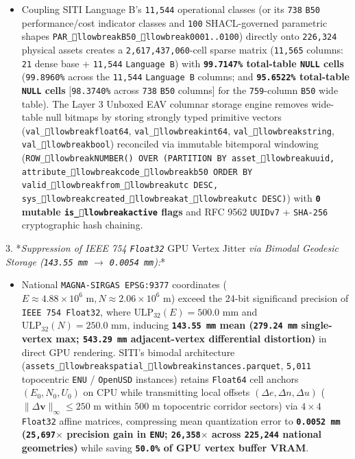 \documentclass[10pt,a4paper]{article}
\begin{document}
\begin{itemize}
  \item Coupling SITI Language B's \texttt{11,544} operational classes (or its \texttt{738} \texttt{B50} performance/cost indicator classes and \texttt{100} SHACL-governed parametric shapes \texttt{PAR\_llowbreak{}B50\_llowbreak{}0001..0100}) directly onto \texttt{226,324} physical assets creates a \texttt{2,617,437,060}-cell sparse matrix (\texttt{11,565} columns: \texttt{21} dense base + \texttt{11,544} \texttt{Language B}) with \textbf{\texttt{99.7147\%} total-table \texttt{NULL} cells} (\texttt{99.8960\%} across the \texttt{11,544} \texttt{Language B} columns; and \textbf{\texttt{95.6522\%} total-table \texttt{NULL} cells} [\texttt{98.3740\%} across \texttt{738} \texttt{B50} columns] for the \texttt{759}-column \texttt{B50} wide table). The Layer 3 Unboxed EAV columnar storage engine removes wide-table null bitmaps by storing strongly typed primitive vectors (\texttt{val\_llowbreak{}float64}, \texttt{val\_llowbreak{}int64}, \texttt{val\_llowbreak{}string}, \texttt{val\_llowbreak{}bool}) reconciled via immutable bitemporal windowing (\texttt{ROW\_llowbreak{}NUMBER() OVER (PARTITION BY asset\_llowbreak{}uuid, attribute\_llowbreak{}code\_llowbreak{}b50 ORDER BY valid\_llowbreak{}from\_llowbreak{}utc DESC, sys\_llowbreak{}created\_llowbreak{}at\_llowbreak{}utc DESC)}) with \textbf{\texttt{0} mutable \texttt{is\_llowbreak{}active} flags} and RFC 9562 \texttt{UUIDv7} + \texttt{SHA-256} cryptographic hash chaining.
\end{itemize}
3. *\textit{Suppression of IEEE 754 \texttt{Float32} }GPU Vertex Jitter\textit{ via Bimodal Geodesic Storage (\texttt{143.55 mm} $\to$ \texttt{0.0054 mm}):}*\par
\begin{itemize}
  \item National \texttt{MAGNA-SIRGAS EPSG:9377} coordinates ($E \approx 4.88 \times 10^6\text{ m}, N \approx 2.06 \times 10^6\text{ m}$) exceed the 24-bit significand precision of \texttt{IEEE 754 Float32}, where $\text{ULP}_{32}(E) = 500.0\text{ mm}$ and $\text{ULP}_{32}(N) = 250.0\text{ mm}$, inducing \textbf{\texttt{143.55 mm} mean (\texttt{279.24 mm} single-vertex max; \texttt{543.29 mm} adjacent-vertex differential distortion)} in direct GPU rendering. SITI's bimodal architecture (\texttt{assets\_llowbreak{}spatial\_llowbreak{}instances.parquet}, \texttt{5,011} topocentric \texttt{ENU} / \texttt{OpenUSD} instances) retains \texttt{Float64} cell anchors $(E_0, N_0, U_0)$ on CPU while transmitting local offsets $(\Delta e, \Delta n, \Delta u)$ ($\|\Delta\mathbf{v}\|_{\infty} \le 250\text{ m}$ within $500\text{ m}$ topocentric corridor sectors) via $4 \times 4$ \texttt{Float32} affine matrices, compressing mean quantization error to \textbf{\texttt{0.0052 mm} (\texttt{25,697$\times$} precision gain in \texttt{ENU}; \texttt{26,358$\times$} across \texttt{225,244} national geometries)} while saving \textbf{\texttt{50.0\%} of GPU vertex buffer VRAM}.
\end{itemize}
\end{document}
